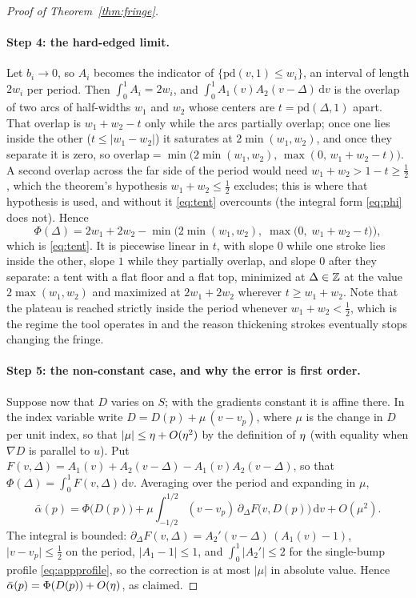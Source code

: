 \begin{proof}[Proof of Theorem~\ref{thm:fringe}]
\paragraph{Step 4: the hard-edged limit.}
Let $b_i\to0$, so $A_i$ becomes the indicator of
$\{\mathrm{pd}(v,1)\le w_i\}$, an interval of length $2w_i$ per period. Then
$\int_0^1 A_i=2w_i$, and $\int_0^1A_1(v)A_2(v-\Delta)\,\mathrm{d}v$ is the
overlap of two arcs of half-widths $w_1$ and $w_2$ whose centers are
$t=\mathrm{pd}(\Delta,1)$ apart. That overlap is $w_1+w_2-t$ only while the arcs
partially overlap; once one lies inside the other ($t\le|w_1-w_2|$) it saturates
at $2\min(w_1,w_2)$, and once they separate it is zero, so
$\mathrm{overlap}=\min\big(2\min(w_1,w_2),\,\max(0,\,w_1+w_2-t)\big)$. A second
overlap across the far side of the period would need $w_1+w_2>1-t\ge\tfrac12$,
which the theorem's hypothesis $w_1+w_2\le\tfrac12$ excludes; this is where
that hypothesis is used, and without it \eqref{eq:tent} overcounts (the integral
form \eqref{eq:phi} does not). Hence
\begin{equation}
  \Phi(\Delta)=2w_1+2w_2-\min\!\big(2\min(w_1,w_2),\;\max\big(0,\;w_1+w_2-t\big)\big),
\end{equation}
which is \eqref{eq:tent}. It is piecewise linear in $t$, with slope $0$ while one
stroke lies inside the other, slope $1$ while they partially overlap, and slope $0$
after they separate: a tent with a flat floor and a flat top, minimized at
$\Delta\in\mathbb{Z}$ at the value $2\max(w_1,w_2)$ and maximized at $2w_1+2w_2$ wherever
$t\ge w_1+w_2$. Note that the plateau is reached strictly inside the period
whenever $w_1+w_2<\tfrac12$, which is the regime the tool operates in and the
reason thickening strokes eventually stops changing the fringe.

\paragraph{Step 5: the non-constant case, and why the error is first order.}
Suppose now that $D$ varies on $S$; with the gradients constant it is affine
there. In the index variable write $D=D(p)+\mu\,(v-v_p)$, where $\mu$ is the
change in $D$ per unit index, so that
$\lvert\mu\rvert\le\eta+O(\eta^2)$ by the definition of $\eta$ (with equality
when $\nabla D$ is parallel to $u$). Put
$F(v,\Delta)=A_1(v)+A_2(v-\Delta)-A_1(v)A_2(v-\Delta)$, so that
$\Phi(\Delta)=\int_0^1F(v,\Delta)\,\mathrm{d}v$. Averaging over the period and
expanding in $\mu$,
\begin{equation}
  \bar\alpha(p)=\Phi\big(D(p)\big)
  +\mu\int_{-1/2}^{1/2}\!\! (v-v_p)\,\partial_\Delta F\big(v,D(p)\big)\,\mathrm{d}v
  +O(\mu^2).
  \label{eq:appfirst}
\end{equation}
The integral is bounded: $\partial_\Delta F(v,\Delta)=A_2'(v-\Delta)\,(A_1(v)-1)$,
$\lvert v-v_p\rvert\le\tfrac12$ on the period, $\lvert A_1-1\rvert\le1$, and
$\int_0^1\lvert A_2'\rvert\le2$ for the single-bump profile \eqref{eq:appprofile},
so the correction is at most $\lvert\mu\rvert$ in absolute value. Hence
$\bar\alpha(p)=\Phi(D(p))+O(\eta)$, as claimed.
\end{proof}

